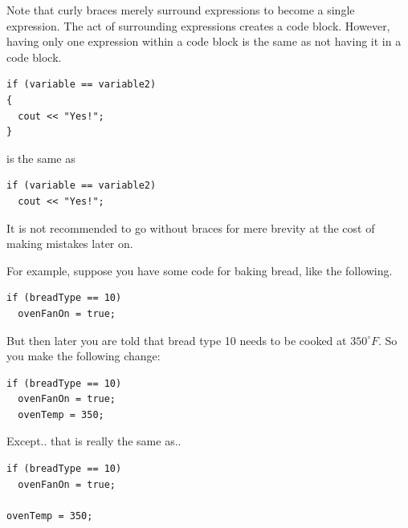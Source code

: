 
Note that curly braces merely surround expressions to become a single expression.
The act of surrounding expressions creates a code block.
However, having only one expression within a code block is the same as not having it in a code block.

\noindent\begin{minipage}{\linewidth}\begin{lstlisting}
if (variable == variable2)
{
  cout << "Yes!";
}
\end{lstlisting}\end{minipage}

\noindent is the same as

\noindent\begin{minipage}{\linewidth}\begin{lstlisting}
if (variable == variable2)
  cout << "Yes!";
\end{lstlisting}\end{minipage}

It is not recommended to go without braces for mere brevity at the cost of making mistakes later on.

For example, suppose you have some code for baking bread, like the following.

\noindent\begin{minipage}{\linewidth}\begin{lstlisting}
if (breadType == 10)
  ovenFanOn = true;
\end{lstlisting}\end{minipage}

But then later you are told that bread type 10 needs to be cooked at $350^{\circ}F$.
So you make the following change:

\noindent\begin{minipage}{\linewidth}\begin{lstlisting}
if (breadType == 10)
  ovenFanOn = true;
  ovenTemp = 350;
\end{lstlisting}\end{minipage}

Except.. that is really the same as.. 

\noindent\begin{minipage}{\linewidth}\begin{lstlisting}
if (breadType == 10)
  ovenFanOn = true;

ovenTemp = 350;
\end{lstlisting}\end{minipage}


